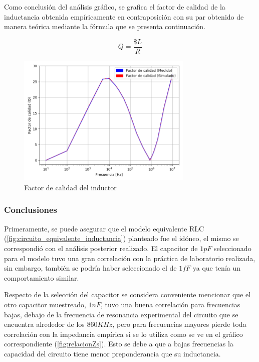Como conclusión del análisis gráfico, se grafica el factor de calidad de la inductancia obtenida empíricamente en contraposición con su par obtenido de manera teórica mediante la fórmula que se presenta continuación.

\begin{equation}
Q= \frac{\$L}{R}
\end{equation}

\begin{figure}[H]
\centering
\includegraphics[width=0.75\textwidth]{Ejercicio_1(Germo)/Grafico/QteovsQcalc.png}
\caption{Factor de calidad del inductor}
\label{fig:QteovsQcalc}
\end{figure}

\subsubsection*{Conclusiones}
Primeramente, se puede asegurar que el modelo equivalente RLC (\ref{fig:circuito_equivalente_inductancia}) planteado fue el idóneo, el mismo se correspondió con el análisis posterior realizado. El capacitor de $1pF$ seleccionado para el modelo tuvo una gran correlación con la práctica de laboratorio realizada, sin embargo, también se podría haber seleccionado el de $1fF$ ya que tenía un comportamiento similar.\par Respecto de la selección del capacitor se considera conveniente mencionar que el otro capacitor muestreado, $1nF$, tuvo una buena correlación para frecuencias bajas, debajo de la frecuencia de resonancia experimental del circuito que se encuentra alrededor de los $860KHz$, pero para frecuencias mayores pierde toda correlación con la impedancia empírica si se lo utiliza como se ve en el gráfico correspondiente (\ref{fig:relacionZs}). Esto se debe a que a bajas frecuencias la capacidad del circuito tiene menor preponderancia que su inductancia.\par

